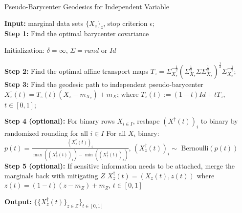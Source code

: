 \documentclass[twoside,11pt]{article}
\begin{document}
\begin{algorithm}
\SetAlgoLined
\caption{Pseudo-Barycenter Geodesics for Independent Variable}
\label{a:independent}

{\bf Input:} marginal data sets $\{X_z\}_z$, stop criterion $\epsilon$;\\

{\bf Step 1:} Find the optimal barycenter covariance\;

Initialization: $\delta = \infty$, $\Sigma = rand$ or $Id$

 
{\bf Step 2:} Find the optimal affine transport maps\;
$T_z = \Sigma_{X_z}^{-\frac{1}{2}} (\Sigma_{X_z}^{\frac{1}{2}} \Sigma \Sigma_{X_z}^{\frac{1}{2}})^{\frac{1}{2}} \Sigma_{X_z}^{-\frac{1}{2}}$; \hfill \tcp{\eqref{eq:independent pseudo-barycenter affine map}}
{\bf Step 3:} Find the geodesic path to independent pseudo-barycenter\;
$X^{\dag}_z(t) = T_z(t) (X_z - m_{X_z}) + m_X$; \hfill \tcp{\eqref{eq:independent pseudo-barycenter }}
where $T_z(t) := (1-t)Id + tT_z$, $t \in [0,1]$; \hfill \tcp{\eqref{eq:mccann interpolation}}

{\bf Step 4 (optional):} For binary rows $X_{i \in I}$, reshape $(X^{\dag}(t))_i$ to binary by randomized rounding for all $i \in I$\;
For all $X_{i}$ binary: $p(t) = \frac{(X^{\dag}_z(t))_i}{\max((X^{\dag}_z(t))_i) - \min((X^{\dag}_z(t))_i)}$, $(X^{\dag}_z(t))_i \sim$ Bernoulli$(p(t))$\;
{\bf Step 5 (optional):} If sensitive information needs to be attached, merge the marginals back with mitigating $Z$\;
$X_z^{\dag}(t) = (X_z(t),z(t))$ where $z(t) = (1-t)(z - m_Z) + m_Z$, $t \in [0,1]$

{\bf Output:} $\{\{X_z^{\dag}(t)\}_{z \in \mathcal{Z}}\}_{t \in [0,1]}$

\end{algorithm}
\end{document}
